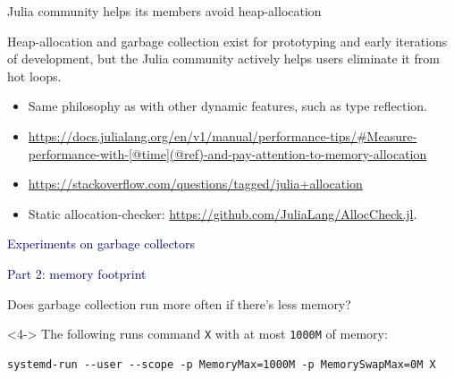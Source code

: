 \documentclass[aspectratio=169]{beamer}
\begin{document}
\begin{frame}{Julia community helps its members avoid heap-allocation}
\vspace{0.5 cm}

Heap-allocation and garbage collection exist for prototyping and early iterations of development, but the Julia community actively helps users eliminate it from hot loops.

\vspace{0.5 cm}
\begin{itemize}\setlength{\itemsep}{0.5 cm}
\item Same philosophy as with other dynamic features, such as type reflection.

\item \textcolor{blue}{\small\url{https://docs.julialang.org/en/v1/manual/performance-tips/\#Measure-performance-with-[@time](@ref)-and-pay-attention-to-memory-allocation}}

\item \textcolor{blue}{\small\url{https://stackoverflow.com/questions/tagged/julia+allocation}}

\item Static allocation-checker: \textcolor{blue}{\small\url{https://github.com/JuliaLang/AllocCheck.jl}}.

\end{itemize}
\end{frame}

\begin{frame}{}
\LARGE
\begin{center}
\textcolor{darkblue}{Experiments on garbage collectors}
\end{center}

\large
\vspace{0.5 cm}
\begin{center}
\textcolor{darkblue}{Part 2: memory footprint}
\end{center}
\end{frame}

\begin{frame}[fragile]{Does garbage collection run more often if there's less memory?}
\Large

\vspace{0.5 cm}
 \Large

\vspace{1 cm}
 \large

\vspace{1 cm}
\begin{uncoverenv}<4->
The following runs command \texttt{X} with at most \texttt{1000M} of memory:

\small
\vspace{0.25 cm}
\begin{verbatim}
systemd-run --user --scope -p MemoryMax=1000M -p MemorySwapMax=0M X
\end{verbatim}
\end{uncoverenv}
\end{frame}
\end{document}
